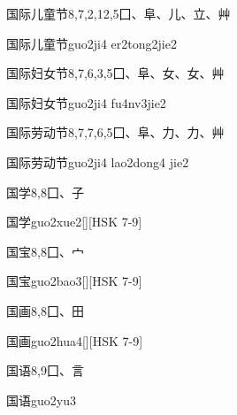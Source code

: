 \begin{Entry}{国际儿童节}{8,7,2,12,5}{⼞、⾩、⼉、⽴、⾋}
  \begin{Phonetics}{国际儿童节}{guo2ji4 er2tong2jie2}
  \end{Phonetics}
\end{Entry}

\begin{Entry}{国际妇女节}{8,7,6,3,5}{⼞、⾩、⼥、⼥、⾋}
  \begin{Phonetics}{国际妇女节}{guo2ji4 fu4nv3jie2}
  \end{Phonetics}
\end{Entry}

\begin{Entry}{国际劳动节}{8,7,7,6,5}{⼞、⾩、⼒、⼒、⾋}
  \begin{Phonetics}{国际劳动节}{guo2ji4 lao2dong4 jie2}
  \end{Phonetics}
\end{Entry}

\begin{Entry}{国学}{8,8}{⼞、⼦}
  \begin{Phonetics}{国学}{guo2xue2}[][HSK 7-9]
  \end{Phonetics}
\end{Entry}

\begin{Entry}{国宝}{8,8}{⼞、⼧}
  \begin{Phonetics}{国宝}{guo2bao3}[][HSK 7-9]
  \end{Phonetics}
\end{Entry}

\begin{Entry}{国画}{8,8}{⼞、⽥}
  \begin{Phonetics}{国画}{guo2hua4}[][HSK 7-9]
  \end{Phonetics}
\end{Entry}

\begin{Entry}{国语}{8,9}{⼞、⾔}
  \begin{Phonetics}{国语}{guo2yu3}
  \end{Phonetics}
\end{Entry}

